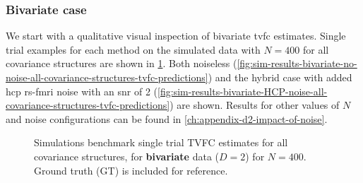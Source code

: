 \subsubsection{Bivariate case}

We start with a qualitative visual inspection of bivariate \gls{tvfc} estimates.
Single trial examples for each method on the simulated data with $N = 400$ for all covariance structures are shown in \cref{fig:sim-results-tvfc-estimates-example}.
Both noiseless (\cref{fig:sim-results-bivariate-no-noise-all-covariance-structures-tvfc-predictions}) and the hybrid case with added \gls{hcp} \gls{rs-fmri} noise with an \gls{snr} of 2 (\cref{fig:sim-results-bivariate-HCP-noise-all-covariance-structures-tvfc-predictions}) are shown.
Results for other values of $N$ and noise configurations can be found in \cref{ch:appendix-d2-impact-of-noise}.


\begin{figure}[t]
  \centering
  \caption{
    Simulations benchmark single trial TVFC estimates for all covariance structures, for \textbf{bivariate} data ($D = 2$) for $N = 400$.
    Ground truth (GT) is included for reference.
  }
  \label{fig:sim-results-tvfc-estimates-example}
\end{figure}


